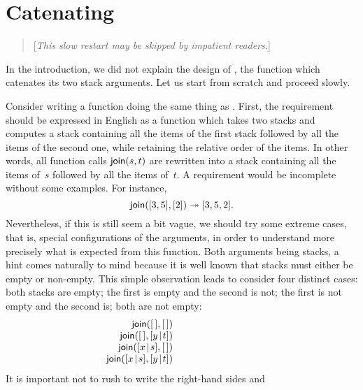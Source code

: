 \section{Catenating}

\begin{quote}
\small[\textsl{This slow restart may be skipped by impatient readers.}]
\end{quote}
In the introduction, we did not explain the design of , the
function which catenates its two stack arguments. Let us start from
scratch and proceed slowly.

Consider writing a function  doing the same thing as
. First, the requirement should be expressed in English as
a function which takes two stacks and computes a stack containing all
the items of the first stack followed by all the items of the second
one, while retaining the relative order of the items. In other words,
all function calls \(\textsf{join}(s,t)\) are rewritten into a stack
containing all the items of~\(s\) followed by all the items
of~\(t\). A requirement would be incomplete without some examples. For
instance,
\begin{equation*}
\textsf{join}([3,5],[2]) \twoheadrightarrow [3,5,2].
\end{equation*}
Nevertheless, if this is still seem a bit vague, we should try some
extreme cases, that is, special configurations of the arguments, in
order to understand more precisely what is expected from this
function. Both arguments being stacks, a hint comes naturally to mind
because it is well known that stacks must either be empty or
non\hyp{}empty. This simple observation leads to consider four
distinct cases: both stacks are empty; the first is empty and the
second is not; the first is not empty and the second is; both are not
empty:
\begin{equation*}
\begin{array}{r@{\;}l@{\;}l}
\fun{join}(\el,\el) & \phantom{\rightarrow} & \phantom{\el;}\\
\fun{join}(\el,\cons{y}{t}) & \phantom{\rightarrow} & \phantom{\cons{y}{t};}\\
\fun{join}(\cons{x}{s},\el) & \phantom{\rightarrow} & \phantom{\cons{x}{s};}\\
\fun{join}(\cons{x}{s},\cons{y}{t}) & \phantom{\rightarrow} &
  \phantom{\cons{x}{\fun{join}(s,\cons{y}{t})}.}
\end{array}
\end{equation*}
It is important not to rush to write the right\hyp{}hand sides and
